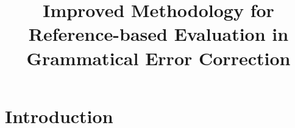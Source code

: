 \documentclass[letter,11pt]{article}
\begin{document}
	
\title{Improved Methodology for Reference-based Evaluation in \\
  Grammatical Error Correction}



\maketitle

\begin{abstract}
	
\end{abstract}

\section{Introduction}



\end{document}

